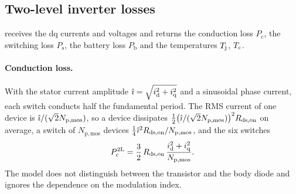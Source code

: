 \subsection{Two-level inverter losses}\label{sec:loss2l}
 receives the dq currents and voltages and returns the conduction loss $P_\mathrm{c}$, the switching loss $P_\mathrm{s}$, the battery loss $P_\mathrm{b}$ and the temperatures $T_\mathrm{j}$, $T_\mathrm{c}$.

\paragraph{Conduction loss.} With the stator current amplitude $\hat\imath=\sqrt{i_\mathrm{d}^2+i_\mathrm{q}^2}$ and a sinusoidal phase current, each switch conducts half the fundamental period. The RMS current of one device is $\hat\imath/(\sqrt2N_\mathrm{p,mos})$, so a device dissipates $\tfrac12\big(\hat\imath/(\sqrt2N_\mathrm{p,mos})\big)^2R_\mathrm{ds,on}$ on average, a switch of $N_\mathrm{p,mos}$ devices $\tfrac14\hat\imath^2R_\mathrm{ds,on}/N_\mathrm{p,mos}$, and the six switches
\begin{equation}
P_\mathrm{c}^\mathrm{2L}=\frac32\,R_\mathrm{ds,on}\,\frac{i_\mathrm{d}^2+i_\mathrm{q}^2}{N_\mathrm{p,mos}}.
\label{eq:pc2l}
\end{equation}
The model does not distinguish between the transistor and the body diode and ignores the dependence on the modulation index.

